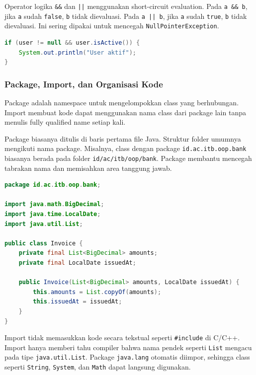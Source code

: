 Operator logika \texttt{\&\&} dan \texttt{||} menggunakan short-circuit evaluation. Pada \texttt{a \&\& b}, jika \texttt{a} sudah \texttt{false}, \texttt{b} tidak dievaluasi. Pada \texttt{a || b}, jika \texttt{a} sudah \texttt{true}, \texttt{b} tidak dievaluasi. Ini sering dipakai untuk mencegah \texttt{NullPointerException}.

\begin{lstlisting}[language=Java, caption={Short-circuit untuk menjaga keamanan akses}, label={lst:short-circuit}]
if (user != null && user.isActive()) {
    System.out.println("User aktif");
}
\end{lstlisting}

\subsubsection{Package, Import, dan Organisasi Kode}

\begin{jawab}
Package adalah namespace untuk mengelompokkan class yang berhubungan. Import membuat kode dapat menggunakan nama class dari package lain tanpa menulis fully qualified name setiap kali.
\end{jawab}

Package biasanya ditulis di baris pertama file Java. Struktur folder umumnya mengikuti nama package. Misalnya, class dengan package \texttt{id.ac.itb.oop.bank} biasanya berada pada folder \texttt{id/ac/itb/oop/bank}. Package membantu mencegah tabrakan nama dan memisahkan area tanggung jawab.

\begin{lstlisting}[language=Java, caption={Package dan import}, label={lst:package-import}]
package id.ac.itb.oop.bank;

import java.math.BigDecimal;
import java.time.LocalDate;
import java.util.List;

public class Invoice {
    private final List<BigDecimal> amounts;
    private final LocalDate issuedAt;

    public Invoice(List<BigDecimal> amounts, LocalDate issuedAt) {
        this.amounts = List.copyOf(amounts);
        this.issuedAt = issuedAt;
    }
}
\end{lstlisting}

Import tidak memasukkan kode secara tekstual seperti \texttt{\#include} di C/C++. Import hanya memberi tahu compiler bahwa nama pendek seperti \texttt{List} mengacu pada tipe \texttt{java.util.List}. Package \texttt{java.lang} otomatis diimpor, sehingga class seperti \texttt{String}, \texttt{System}, dan \texttt{Math} dapat langsung digunakan.

